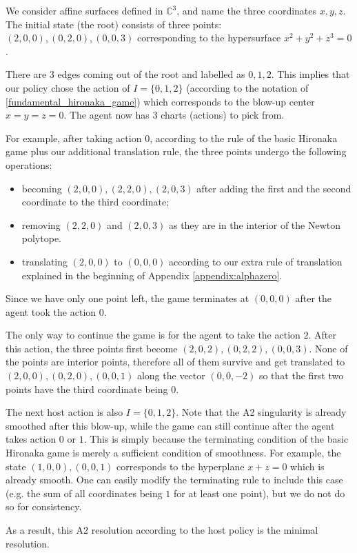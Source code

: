 \documentclass{article}
\theoremstyle{plain}
\theoremstyle{definition}
\theoremstyle{remark}
\begin{document}
We consider affine surfaces defined in $\mathbb C^3$, and name the three coordinates $x,y,z$. The initial state (the root) consists of three points: $(2,0,0), (0,2,0), (0,0,3)$ corresponding to the hypersurface $x^2 + y^2 + z^3 = 0$.

There are $3$ edges coming out of the root and labelled as $0, 1, 2$. This implies that our policy chose the action of $I=\{0,1,2\}$ (according to the notation of \ref{fundamental_hironaka_game}) which corresponds to the blow-up center $x=y=z=0$. The agent now has $3$ charts (actions) to pick from. 

For example, after taking action $0$, according to the rule of the basic Hironaka game plus our additional translation rule, the three points undergo the following operations:
\begin{itemize}
\item becoming $(2,0,0), (2,2,0), (2,0,3)$ after adding the first and the second coordinate to the third coordinate;
\item removing $(2,2,0)$ and $(2,0,3)$ as they are in the interior of the Newton polytope.
\item translating $(2,0,0)$ to $(0,0,0)$ according to our extra rule of translation explained in the beginning of Appendix \ref{appendix:alphazero}.
\end{itemize}
Since we have only one point left, the game terminates at $(0,0,0)$ after the agent took the action $0$.

The only way to continue the game is for the agent to take the action $2$. After this action, the three points first become $(2,0,2), (0,2,2), (0,0,3)$. None of the points are interior points, therefore all of them survive and get translated to $(2,0,0), (0,2,0), (0,0,1)$ along the vector $(0,0,-2)$ so that the first two points have the third coordinate being $0$. 

The next host action is also $I=\{0,1,2\}$. Note that the A2 singularity is already smoothed after this blow-up, while the game can still continue after the agent takes action $0$ or $1$. This is simply because the terminating condition of the basic Hironaka game is merely a sufficient condition of smoothness. For example, the state $(1,0,0), (0,0,1)$ corresponds to the hyperplane $x + z = 0$ which is already smooth. One can easily modify the terminating rule to include this case (e.g. the sum of all coordinates being $1$ for at least one point), but we do not do so for consistency.

As a result, this A2 resolution according to the host policy is the minimal resolution.
\end{document}
